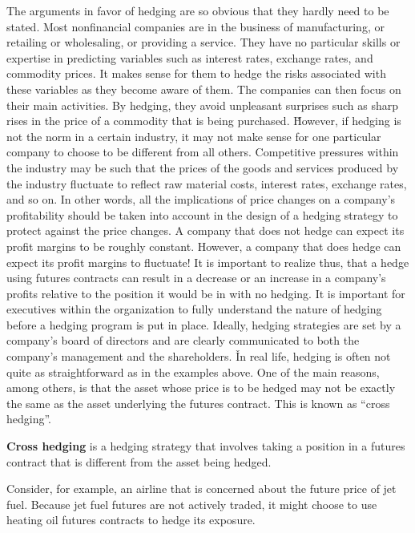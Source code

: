 The arguments in favor of hedging are so obvious that they hardly need to be stated. Most nonfinancial companies are
in the business of manufacturing, or retailing or wholesaling, or providing a service. They have no particular
skills or expertise in predicting variables such as interest rates, exchange rates, and commodity prices. It makes
sense for them to hedge the risks associated with these variables as they become aware of them. The companies can
then focus on their main activities. By hedging, they avoid unpleasant surprises such as sharp rises in the price of
a commodity that is being purchased. \v

However, if hedging is not the norm in a certain industry, it may not make sense for one particular company to
choose to be different from all others. Competitive pressures within the industry may be such that the prices of the
goods and services produced by the industry fluctuate to reflect raw material costs, interest rates, exchange rates,
and so on. In other words, all the implications of price changes on a company’s profitability should be taken into
account in the design of a hedging strategy to protect against the price changes. A company that does not hedge can
expect its profit margins to be roughly constant. However, a company that does hedge can expect its profit margins
to fluctuate! It is important to realize thus, that a hedge using futures contracts can result in a decrease or an
increase in a company’s profits relative to the position it would be in with no hedging. It is important for
executives within the organization to fully understand the nature of hedging before a hedging program is put in
place. Ideally, hedging strategies are set by a company’s board of directors and are clearly communicated to both
the company’s management and the shareholders. \v

In real life, hedging is often not quite as straightforward as in the examples above. One of the main reasons, among
others, is that the asset whose price is to be hedged may not be exactly the same as the asset underlying the futures
contract. This is known as ``cross hedging''.

\textbf{Cross hedging} is a hedging strategy that involves taking a position in a futures contract that is different
from the asset being hedged.
\ed

\be
Consider, for example, an airline that is concerned about the future price of jet fuel. Because jet fuel futures are
not actively traded, it might choose to use heating oil futures contracts to hedge its exposure.
\ee

